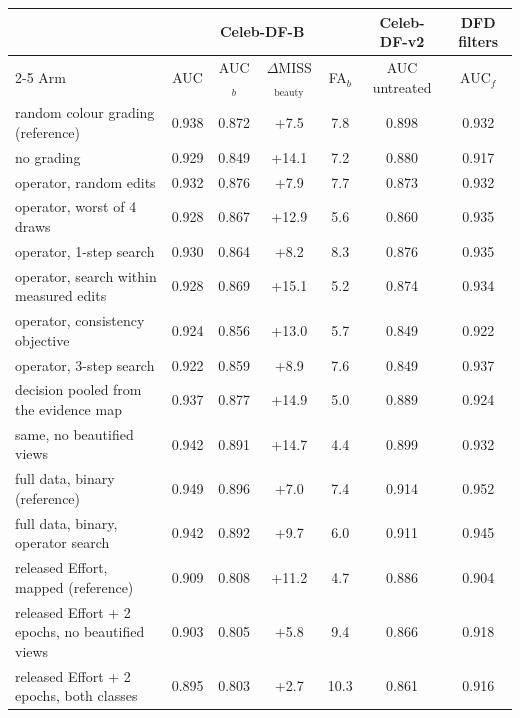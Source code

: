 \begin{tabular}{@{}l cccc c c@{}}
\toprule
 & \multicolumn{4}{c}{Celeb-DF-B} & Celeb-DF-v2 & DFD filters \\
\cmidrule(lr){2-5}
Arm & AUC & AUC$_b$ & $\Delta$MISS$_\text{beauty}$ & FA$_b$ & AUC untreated & AUC$_f$ \\
\midrule
random colour grading (reference) & 0.938 & 0.872 & +7.5 & 7.8 & 0.898 & 0.932 \\
no grading & 0.929 & 0.849 & +14.1 & 7.2 & 0.880 & 0.917 \\
operator, random edits & 0.932 & 0.876 & +7.9 & 7.7 & 0.873 & 0.932 \\
operator, worst of 4 draws & 0.928 & 0.867 & +12.9 & 5.6 & 0.860 & 0.935 \\
operator, 1-step search & 0.930 & 0.864 & +8.2 & 8.3 & 0.876 & 0.935 \\
operator, search within measured edits & 0.928 & 0.869 & +15.1 & 5.2 & 0.874 & 0.934 \\
operator, consistency objective & 0.924 & 0.856 & +13.0 & 5.7 & 0.849 & 0.922 \\
operator, 3-step search & 0.922 & 0.859 & +8.9 & 7.6 & 0.849 & 0.937 \\
decision pooled from the evidence map & 0.937 & 0.877 & +14.9 & 5.0 & 0.889 & 0.924 \\
same, no beautified views & 0.942 & 0.891 & +14.7 & 4.4 & 0.899 & 0.932 \\
\midrule
full data, binary (reference) & 0.949 & 0.896 & +7.0 & 7.4 & 0.914 & 0.952 \\
full data, binary, operator search & 0.942 & 0.892 & +9.7 & 6.0 & 0.911 & 0.945 \\
\midrule
released Effort, mapped (reference) & 0.909 & 0.808 & +11.2 & 4.7 & 0.886 & 0.904 \\
released Effort + 2 epochs, no beautified views & 0.903 & 0.805 & +5.8 & 9.4 & 0.866 & 0.918 \\
released Effort + 2 epochs, both classes & 0.895 & 0.803 & +2.7 & 10.3 & 0.861 & 0.916 \\
\bottomrule
\end{tabular}
